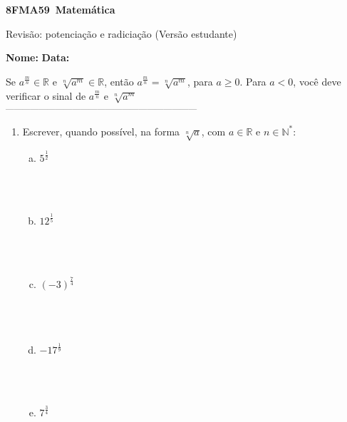 \documentclass[a4paper,14pt]{article}
\begin{document}
	
	\noindent\textbf{8FMA59~Matemática} 
	
	\begin{center}Revisão: potenciação e radiciação (Versão estudante)
	\end{center}
	
	\noindent\textbf{Nome:} \underline{\hspace{10cm}}
	\noindent\textbf{Data:} \underline{\hspace{4cm}}
	
	
	
    \begin{multicols}{2}
    	Se $a^\frac{m}{n} \in \mathbb{R}$ e $\sqrt[n]{a^m} \in \mathbb{R}$, então $a^\frac{m}{n} = \sqrt[n]{a^m}$, para $a \geq 0$. Para $a < 0$, você deve verificar o sinal de $a^\frac{m}{n}$ e $\sqrt[n]{a^m}$ \\
    	\textsubscript{---------------------------------------------------------------------}
    	\begin{enumerate}
    		\item Escrever, quando possível, na forma $\sqrt[n]{a}$, com $a \in \mathbb{R}$ e $n \in \mathbb{N^*}$:
    		\begin{enumerate}[a)]
    			\item $5^\frac{1}{2}$ \\\\\\\\
    			\item $12^\frac{1}{5}$ \\\\\\\\
    			\item $(-3)^\frac{7}{4}$ \\\\\\\\
    			\item $-17^\frac{1}{9}$ \\\\\\\\
    			\item $7^\frac{3}{4}$ \\\\\\\\

\end{enumerate}
\end{enumerate}
\end{multicols}
\end{document}
